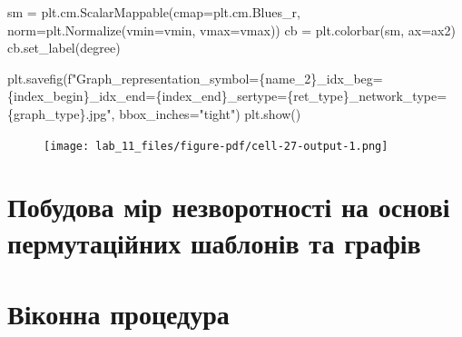 \documentclass[
  letterpaper,
]{report}
\newenvironment{Shaded}{\begin{snugshade}}{\end{snugshade}}
\newcommand{\NormalTok}[1]{\textcolor[rgb]{0.00,0.23,0.31}{#1}}
\newcommand{\OperatorTok}[1]{\textcolor[rgb]{0.37,0.37,0.37}{#1}}
\newcommand{\SpecialCharTok}[1]{\textcolor[rgb]{0.37,0.37,0.37}{#1}}
\newcommand{\SpecialStringTok}[1]{\textcolor[rgb]{0.13,0.47,0.30}{#1}}
\newcommand{\StringTok}[1]{\textcolor[rgb]{0.13,0.47,0.30}{#1}}
\begin{document}
\begin{Shaded}
\begin{Highlighting}[]
\NormalTok{sm }\OperatorTok{=}\NormalTok{ plt.cm.ScalarMappable(cmap}\OperatorTok{=}\NormalTok{plt.cm.Blues\_r, norm}\OperatorTok{=}\NormalTok{plt.Normalize(vmin}\OperatorTok{=}\NormalTok{vmin, vmax}\OperatorTok{=}\NormalTok{vmax))}
\NormalTok{cb }\OperatorTok{=}\NormalTok{ plt.colorbar(sm, ax}\OperatorTok{=}\NormalTok{ax2)}
\NormalTok{cb.set\_label(}\StringTok{\textquotesingle{}degree\textquotesingle{}}\NormalTok{)}

\NormalTok{plt.savefig(}\SpecialStringTok{f"Graph\_representation\_symbol=}\SpecialCharTok{\{}\NormalTok{name\_2}\SpecialCharTok{\}}\SpecialStringTok{\_idx\_beg=}\SpecialCharTok{\{}\NormalTok{index\_begin}\SpecialCharTok{\}}\SpecialStringTok{\_idx\_end=}\SpecialCharTok{\{}\NormalTok{index\_end}\SpecialCharTok{\}}\SpecialStringTok{\_sertype=}\SpecialCharTok{\{}\NormalTok{ret\_type}\SpecialCharTok{\}}\SpecialStringTok{\_network\_type=}\SpecialCharTok{\{}\NormalTok{graph\_type}\SpecialCharTok{\}}\SpecialStringTok{.jpg"}\NormalTok{, bbox\_inches}\OperatorTok{=}\StringTok{"tight"}\NormalTok{)}
\NormalTok{plt.show()}
\end{Highlighting}
\end{Shaded}

\begin{figure}[H]

{\centering \texttt{[image: lab\_11\_files/figure-pdf/cell-27-output-1.png]}

}

\end{figure}

\hypertarget{ux43fux43eux431ux443ux434ux43eux432ux430-ux43cux456ux440-ux43dux435ux437ux432ux43eux440ux43eux442ux43dux43eux441ux442ux456-ux43dux430-ux43eux441ux43dux43eux432ux456-ux43fux435ux440ux43cux443ux442ux430ux446ux456ux439ux43dux438ux445-ux448ux430ux431ux43bux43eux43dux456ux432-ux442ux430-ux433ux440ux430ux444ux456ux432}{%
\section{Побудова мір незворотності на основі пермутаційних шаблонів та
графів}\label{ux43fux43eux431ux443ux434ux43eux432ux430-ux43cux456ux440-ux43dux435ux437ux432ux43eux440ux43eux442ux43dux43eux441ux442ux456-ux43dux430-ux43eux441ux43dux43eux432ux456-ux43fux435ux440ux43cux443ux442ux430ux446ux456ux439ux43dux438ux445-ux448ux430ux431ux43bux43eux43dux456ux432-ux442ux430-ux433ux440ux430ux444ux456ux432}}

\hypertarget{ux432ux456ux43aux43eux43dux43dux430-ux43fux440ux43eux446ux435ux434ux443ux440ux430-3}{%
\section{Віконна
процедура}\label{ux432ux456ux43aux43eux43dux43dux430-ux43fux440ux43eux446ux435ux434ux443ux440ux430-3}}
\end{document}
